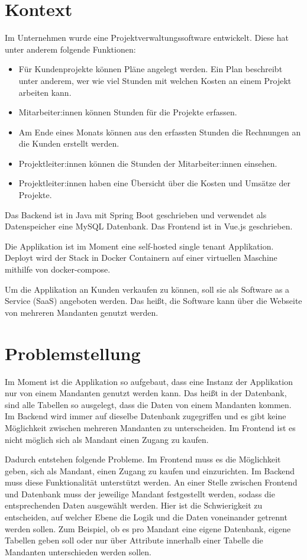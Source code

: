 \section{Kontext}\label{sec:kontext}

Im Unternehmen wurde eine Projektverwaltungssoftware entwickelt.
Diese hat unter anderem folgende Funktionen:
\begin{itemize}
  \item Für Kundenprojekte können Pläne angelegt werden. Ein Plan beschreibt unter anderem, wer wie viel Stunden mit welchen Kosten an einem Projekt arbeiten kann. 
  \item Mitarbeiter:innen können Stunden für die Projekte erfassen.
  \item Am Ende eines Monats können aus den erfassten Stunden die Rechnungen an die Kunden erstellt werden.
  \item Projektleiter:innen können die Stunden der Mitarbeiter:innen einsehen.
  \item Projektleiter:innen haben eine Übersicht über die Kosten und Umsätze der Projekte.
\end{itemize}

Das Backend ist in Java mit Spring Boot geschrieben und verwendet als
Datenspeicher eine MySQL Datenbank.
Das Frontend ist in Vue.js geschrieben.

Die Applikation ist im Moment eine self-hosted single tenant Applikation.
Deployt wird der Stack in Docker Containern auf einer virtuellen Maschine mithilfe von docker-compose.

Um die Applikation an Kunden verkaufen zu können, soll sie als Software
as a Service (SaaS) angeboten werden.
Das heißt, die Software kann über die Webseite von mehreren Mandanten genutzt werden.


\section{Problemstellung}\label{sec:problemstellung}

Im Moment ist die Applikation so aufgebaut, dass eine Instanz der Applikation nur von einem Mandanten genutzt werden kann.
Das heißt in der Datenbank, sind alle Tabellen so ausgelegt, dass die Daten von einem Mandanten kommen.
Im Backend wird immer auf dieselbe Datenbank zugegriffen und es gibt keine Möglichkeit zwischen mehreren Mandanten zu unterscheiden.
Im Frontend ist es nicht möglich sich als Mandant einen Zugang zu kaufen.

Dadurch entstehen folgende Probleme.
Im Frontend muss es die Möglichkeit geben, sich als Mandant, einen Zugang zu kaufen und einzurichten.
Im Backend muss diese Funktionalität unterstützt werden.
An einer Stelle zwischen Frontend und Datenbank muss der jeweilige Mandant festgestellt werden, sodass die entsprechenden Daten ausgewählt werden.
Hier ist die Schwierigkeit zu entscheiden, auf welcher Ebene die Logik und die Daten voneinander getrennt werden sollen.
Zum Beispiel, ob es pro Mandant eine eigene Datenbank, eigene Tabellen geben soll oder nur über Attribute innerhalb einer Tabelle die Mandanten unterschieden werden sollen.

